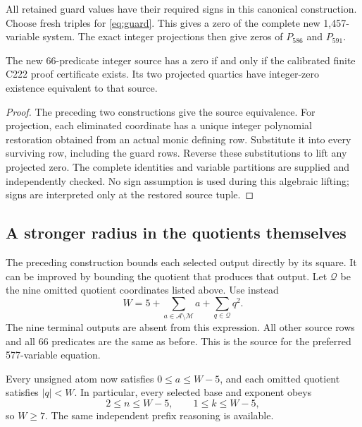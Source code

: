 All retained guard values have their required signs in this canonical construction. Choose fresh triples for \eqref{eq:guard}. This gives a zero of the complete new 1,457-variable system. The exact integer projections then give zeros of \(P_{586}\) and \(P_{591}\).

\begin{proposition}\label{prop:existence}
The new 66-predicate integer source has a zero if and only if the calibrated finite C222 proof certificate exists. Its two projected quartics have integer-zero existence equivalent to that source.
\end{proposition}

\begin{proof}
The preceding two constructions give the source equivalence. For projection, each eliminated coordinate has a unique integer polynomial restoration obtained from an actual monic defining row. Substitute it into every surviving row, including the guard rows. Reverse these substitutions to lift any projected zero. The complete identities and variable partitions are supplied and independently checked. No sign assumption is used during this algebraic lifting; signs are interpreted only at the restored source tuple.
\end{proof}

\subsection{A stronger radius in the quotients themselves}\label{sec:quotient}

The preceding construction bounds each selected output directly by its square. It can be improved by bounding the quotient that produces that output. Let \(\mathcal Q\) be the nine omitted quotient coordinates listed above. Use instead
\begin{equation}\label{eq:quotientradius}
\boxed{W=5+\sum_{a\in\mathcal A\setminus\mathcal M}a+
\sum_{q\in\mathcal Q}q^2.}
\end{equation}
The nine terminal outputs are absent from this expression. All other source rows and all 66 predicates are the same as before. This is the source for the preferred 577-variable equation.

Every unsigned atom now satisfies \(0\le a\le W-5\), and each omitted quotient satisfies \(|q|<W\). In particular, every selected base and exponent obeys
\[
2\le n\le W-5,\qquad 1\le k\le W-5,
\]
so \(W\ge7\). The same independent prefix reasoning is available.

